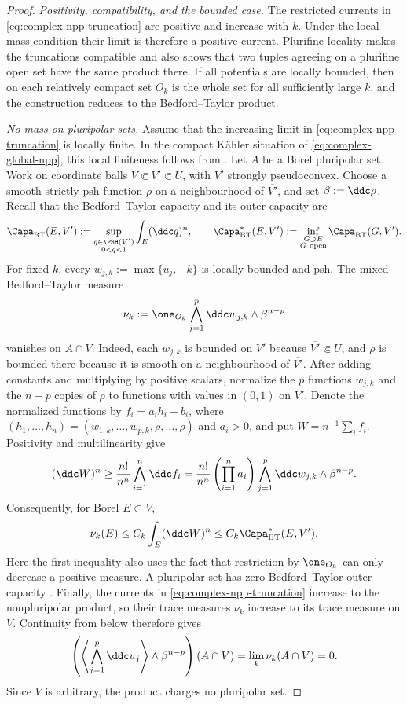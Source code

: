 \begin{proof}
\emph{Positivity, compatibility, and the bounded case.}
The restricted currents in \eqref{eq:complex-npp-truncation} are positive
and increase with \(k\).  Under the local mass condition their limit is
therefore a positive current.  Plurifine locality makes the truncations
compatible and also shows that two tuples agreeing on a plurifine open set
have the same product there.  If all potentials are locally bounded, then
on each relatively compact set \(O_k\) is the whole set for all sufficiently
large \(k\), and the construction reduces to the Bedford--Taylor product.

\emph{No mass on pluripolar sets.}  Assume that the increasing limit in
\eqref{eq:complex-npp-truncation} is locally finite.  In the compact K\"ahler
situation of \eqref{eq:complex-global-npp}, this local finiteness follows from
\cite[Proposition~1.6]{BEGZ10}.  Let \(A\) be a Borel pluripolar set.  Work
on coordinate balls \(V\Subset V'\Subset U\), with \(V'\) strongly
pseudoconvex.  Choose a smooth strictly psh function \(\rho\) on a
neighbourhood of \(\overline{V'}\), and set \(\beta:=\ddc\rho\).  Recall
that the Bedford--Taylor capacity and its outer capacity are
\[
 \Capa_{\mathrm{BT}}(E,V')
 :=\sup_{\substack{q\in\PSH(V')\\0<q<1}}
       \int_E(\ddc q)^n,
 \qquad
 \Capa_{\mathrm{BT}}^*(E,V')
 :=\inf_{\substack{G\supset E\\G\ \mathrm{open}}}
       \Capa_{\mathrm{BT}}(G,V').
\]
For fixed \(k\), every
\(w_{j,k}:=\max\{u_j,-k\}\) is locally bounded and psh.  The mixed
Bedford--Taylor measure
\[
 \nu_k:=\one_{O_k}\bigwedge_{j=1}^p\ddc w_{j,k}
                   \wedge\beta^{n-p}
\]
vanishes on \(A\cap V\).  Indeed, each \(w_{j,k}\) is bounded on \(V'\)
because \(\overline{V'}\Subset U\), and \(\rho\) is bounded there because
it is smooth on a neighbourhood of \(\overline{V'}\).  After adding
constants and multiplying by positive scalars, normalize the \(p\) functions
\(w_{j,k}\) and the \(n-p\) copies of \(\rho\) to functions with values in
\((0,1)\) on \(V'\).  Denote the normalized functions by
\(f_i=a_i h_i+b_i\), where
\((h_1,\ldots,h_n)=(w_{1,k},\ldots,w_{p,k},\rho,\ldots,\rho)\) and
\(a_i>0\), and put \(W=n^{-1}\sum_i f_i\).  Positivity and
multilinearity give
\[
 (\ddc W)^n\geq\frac{n!}{n^n}\bigwedge_{i=1}^n\ddc f_i
 =\frac{n!}{n^n}\left(\prod_{i=1}^na_i\right)
   \bigwedge_{j=1}^p\ddc w_{j,k}\wedge\beta^{n-p}.
\]
Consequently, for Borel \(E\subset V\),
\[
 \nu_k(E)\leq C_k\int_E(\ddc W)^n
             \leq C_k\Capa_{\mathrm{BT}}^*(E,V').
\]
Here the first inequality also uses the fact that restriction by
\(\one_{O_k}\) can only decrease a positive measure.  A pluripolar set has
zero Bedford--Taylor outer capacity
\cite[Theorem~6.9]{BT82}.  Finally, the currents in
\eqref{eq:complex-npp-truncation} increase to the nonpluripolar product, so
their trace measures \(\nu_k\) increase to its trace measure on \(V\).
Continuity from below therefore gives
\[
 \left(\left\langle\bigwedge_{j=1}^p\ddc u_j\right\rangle
       \wedge\beta^{n-p}\right)(A\cap V)
 =\lim_k\nu_k(A\cap V)=0.
\]
Since \(V\) is arbitrary, the product charges no pluripolar set.


\end{proof}
